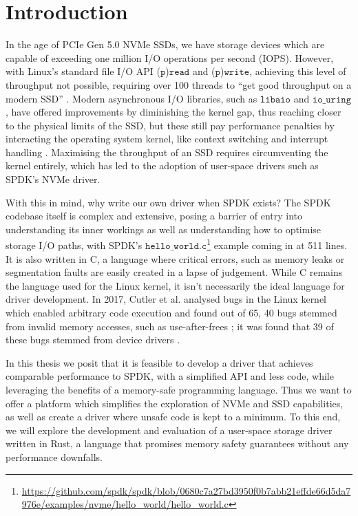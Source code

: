 \chapter{Introduction}\label{chapter:introduction}
In the age of PCIe Gen 5.0 NVMe SSDs, we have storage devices which are capable of exceeding one million I/O operations per second (IOPS). However, with Linux's standard file I/O API ($\texttt{p}$)$\texttt{read}$ and ($\texttt{p}$)$\texttt{write}$, achieving this level of throughput not possible, requiring over 100 threads to ``get good throughput on a modern SSD'' \cite{haas2020exploiting}. Modern asynchronous I/O libraries, such as $\texttt{libaio}$ and $\texttt{io\_uring}$, have offered improvements by diminishing the kernel gap, thus reaching closer to the physical limits of the SSD, but these still pay performance penalties by interacting the operating system kernel, like context switching and interrupt handling \cite{storage_api}. Maximising the throughput of an SSD requires circumventing the kernel entirely, which has led to the adoption of user-space drivers such as SPDK's NVMe driver.

With this in mind, why write our own driver when SPDK exists? The SPDK codebase itself is complex and extensive, posing a barrier of entry into understanding its inner workings as well as understanding how to optimise storage I/O paths, with SPDK's $\texttt{hello\_world.c}$\footnote{\url{https://github.com/spdk/spdk/blob/0680c7a27bd3950f0b7abb21effde66d5da7976e/examples/nvme/hello_world/hello_world.c}} example coming in at 511 lines. It is also written in C, a language where critical errors, such as memory leaks or segmentation faults are easily created in a lapse of judgement. While C remains the language used for the Linux kernel, it isn't necessarily the ideal language for driver development. In 2017, Cutler et al. analysed bugs in the Linux kernel which enabled arbitrary code execution and found out of 65, 40 bugs stemmed from invalid memory accesses, such as use-after-frees \cite{cutler}; it was found that 39 of these bugs stemmed from device drivers \cite{driver_lang}.

In this thesis we posit that it is feasible to develop a driver that achieves comparable performance to SPDK, with a simplified API and less code, while leveraging the benefits of a memory-safe programming language. Thus we want to offer a platform which simplifies the exploration of NVMe and SSD capabilities, as well as create a driver where unsafe code is kept to a minimum. To this end, we will explore the development and evaluation of a user-space storage driver written in Rust, a language that promises memory safety guarantees without any performance downfalls.

